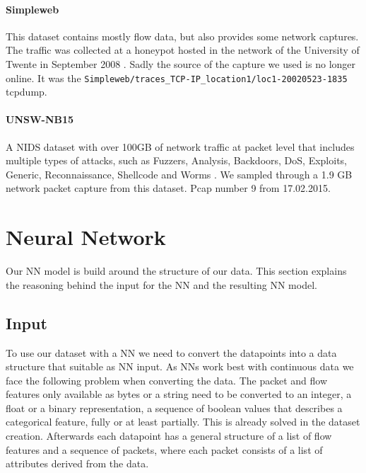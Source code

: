 \documentclass[
	ngerman,
	ruledheaders=section,%
	class=report,%
	thesis={type=bachelor},%
	accentcolor=9c,%
	custommargins=true,%
	marginpar=false,%
	parskip=half-,%
	fontsize=11pt,%
]{tudapub}
\let\code\texttt
\begin{document}
\paragraph{Simpleweb} This dataset contains mostly flow data, but also provides some network captures.
The traffic was collected at a honeypot hosted in the network of the University of Twente in September 2008 \cite{LabeledDatasetIntrusiona}.
Sadly the source of the capture we used is no longer online.
It was the \code{Simpleweb/traces\_TCP-IP\_location1/loc1-20020523-1835} tcpdump.

\paragraph{UNSW-NB15} A NIDS dataset with over 100GB of network traffic at packet level that includes multiple types of attacks, such as Fuzzers, Analysis, Backdoors, DoS, Exploits, Generic, Reconnaissance, Shellcode and Worms \cite{UNSWNB15DataSet}.
We sampled through a 1.9 GB network packet capture from this dataset.
Pcap number 9 from 17.02.2015.

\section{Neural Network}
\label{sec:NN}

Our NN model is build around the structure of our data.
This section explains the reasoning behind the input for the NN and the resulting NN model.

\subsection{Input}
\label{sec:NNinput}

To use our dataset with a NN we need to convert the datapoints into a data structure that suitable as NN input.
As NNs work best with continuous data we face the following problem when converting the data.
The packet and flow features only available as bytes or a string need to be converted to an integer, a float or a binary representation, a sequence of boolean values that describes a categorical feature, fully or at least partially.
This is already solved in the dataset creation.
Afterwards each datapoint has a general structure of a list of flow features and a sequence of packets, where each packet consists of a list of attributes derived from the data.
\end{document}
